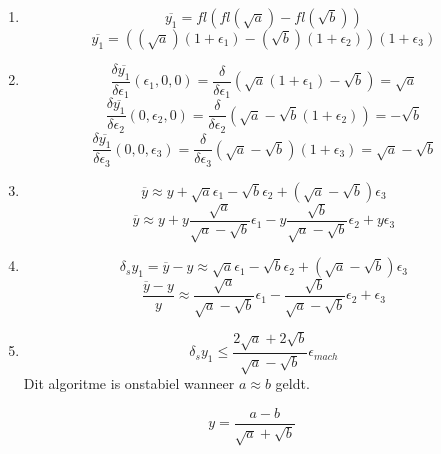 \documentclass[12pt,a4paper]{article}
\begin{document}
\begin{enumerate}
\item
\[
\overline{y_1} = fl(fl(\sqrt{a}) - fl(\sqrt{b}))
\]
\[
\overline{y_1} = ((\sqrt{a})(1+\epsilon_1) - (\sqrt{b})(1+\epsilon_2))(1+\epsilon_3)
\]

\item
\[
\frac{\delta\overline{y_1}}{\delta\epsilon_1}(\epsilon_1,0,0)
= \frac{\delta}{\delta\epsilon_1} \left( \sqrt{a}(1+\epsilon_1)-\sqrt{b} \right)
= \sqrt{a}
\]
\[
\frac{\delta\overline{y_1}}{\delta\epsilon_2}(0,\epsilon_2,0)
= \frac{\delta}{\delta\epsilon_2} \left( \sqrt{a}-\sqrt{b}(1+\epsilon_2) \right)
= -\sqrt{b}
\]
\[
\frac{\delta\overline{y_1}}{\delta\epsilon_3}(0,0,\epsilon_3)
= \frac{\delta}{\delta\epsilon_3} \left( \sqrt{a}-\sqrt{b} \right)(1+\epsilon_3)
= \sqrt{a}-\sqrt{b}
\]

\item
\[
\overline{y} \approx y
+ \sqrt{a}\epsilon_1
- \sqrt{b}\epsilon_2
+ (\sqrt{a}-\sqrt{b}) \epsilon_3
\]
\[
\overline{y} \approx y
+ y\frac{\sqrt{a}}{\sqrt{a}-\sqrt{b}}\epsilon_1
- y\frac{\sqrt{b}}{\sqrt{a}-\sqrt{b}}\epsilon_2
+ y \epsilon_3
\]

\item
\[
\delta_sy_1 = 
\overline{y} - y \approx
\sqrt{a}\epsilon_1
- \sqrt{b}\epsilon_2
+ (\sqrt{a}-\sqrt{b}) \epsilon_3
\]
\[
\frac{\overline{y}-y}{y} \approx
  \frac{\sqrt{a}}{\sqrt{a}-\sqrt{b}}\epsilon_1
- \frac{\sqrt{b}}{\sqrt{a}-\sqrt{b}}\epsilon_2
+ \epsilon_3
\]

\item
\[
\delta_sy_1 \le \frac{2\sqrt{a}+2\sqrt{b}}{\sqrt{a}-\sqrt{b}}\epsilon_{mach}
\]
Dit algoritme is onstabiel wanneer $a \approx b$ geldt.

\end{enumerate}

\[
y = \frac{a-b}{\sqrt{a}+\sqrt{b}}
\]
\end{document}
